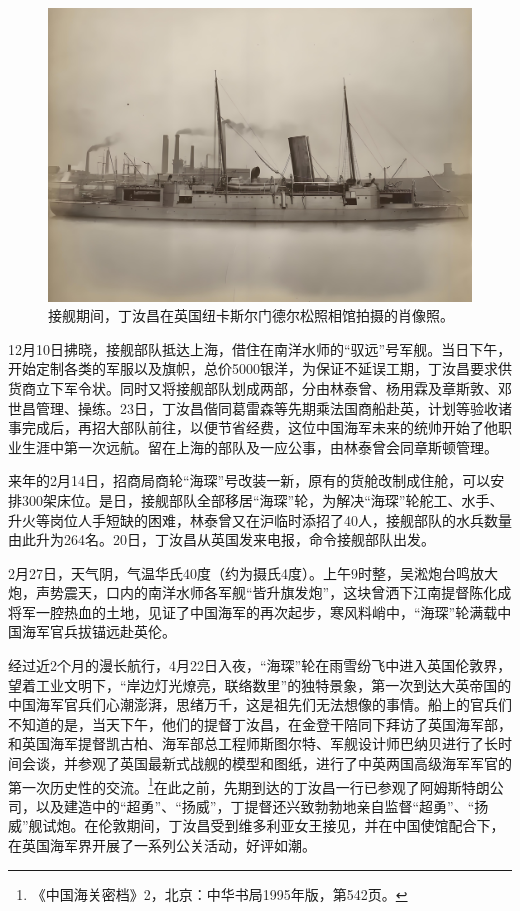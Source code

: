 \documentclass[12pt,UTF8]{ctexbook}
\begin{document}
\begin{figure}[htbp]
	\centering
	\includegraphics[width=1\linewidth]{Images/30}
	\caption{接舰期间，丁汝昌在英国纽卡斯尔门德尔松照相馆拍摄的肖像照。}
	\label{fig:1}
\end{figure}

12月10日拂晓，接舰部队抵达上海，借住在南洋水师的“驭远”号军舰。当日下午，开始定制各类的军服以及旗帜，总价5000银洋，为保证不延误工期，丁汝昌要求供货商立下军令状。同时又将接舰部队划成两部，分由林泰曾、杨用霖及章斯敦、邓世昌管理、操练。23日，丁汝昌偕同葛雷森等先期乘法国商船赴英，计划等验收诸事完成后，再招大部队前往，以便节省经费，这位中国海军未来的统帅开始了他职业生涯中第一次远航。留在上海的部队及一应公事，由林泰曾会同章斯顿管理。

来年的2月14日，招商局商轮“海琛”号改装一新，原有的货舱改制成住舱，可以安排300架床位。是日，接舰部队全部移居“海琛”轮，为解决“海琛”轮舵工、水手、升火等岗位人手短缺的困难，林泰曾又在沪临时添招了40人，接舰部队的水兵数量由此升为264名。20日，丁汝昌从英国发来电报，命令接舰部队出发。

2月27日，天气阴，气温华氏40度（约为摄氏4度）。上午9时整，吴淞炮台鸣放大炮，声势震天，口内的南洋水师各军舰“皆升旗发炮”，这块曾洒下江南提督陈化成将军一腔热血的土地，见证了中国海军的再次起步，寒风料峭中，“海琛”轮满载中国海军官兵拔锚远赴英伦。

经过近2个月的漫长航行，4月22日入夜，“海琛”轮在雨雪纷飞中进入英国伦敦界，望着工业文明下，“岸边灯光燎亮，联络数里”的独特景象，第一次到达大英帝国的中国海军官兵们心潮澎湃，思绪万千，这是祖先们无法想像的事情。船上的官兵们不知道的是，当天下午，他们的提督丁汝昌，在金登干陪同下拜访了英国海军部，和英国海军提督凯古柏、海军部总工程师斯图尔特、军舰设计师巴纳贝进行了长时间会谈，并参观了英国最新式战舰的模型和图纸，进行了中英两国高级海军军官的第一次历史性的交流。\footnote{《中国海关密档》2，北京：中华书局1995年版，第542页。}在此之前，先期到达的丁汝昌一行已参观了阿姆斯特朗公司，以及建造中的“超勇”、“扬威”，丁提督还兴致勃勃地亲自监督“超勇”、“扬威”舰试炮。在伦敦期间，丁汝昌受到维多利亚女王接见，并在中国使馆配合下，在英国海军界开展了一系列公关活动，好评如潮。
\end{document}

